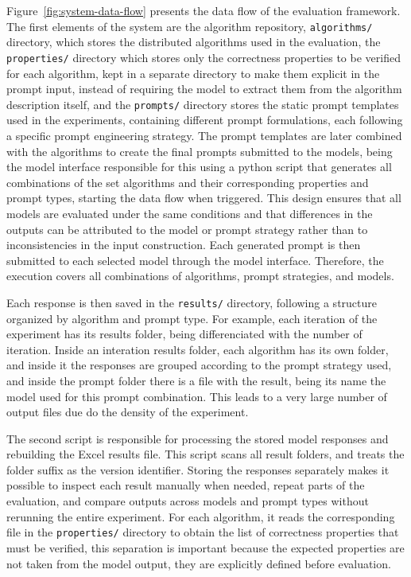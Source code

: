 Figure~\ref{fig:system-data-flow} presents the data flow of the evaluation framework. The first elements of the system are the algorithm repository, \texttt{algorithms/} directory, which stores the distributed algorithms used in the evaluation, the \texttt{properties/} directory which stores only the correctness properties to be verified for each algorithm, kept in a separate directory to make them explicit in the prompt input, instead of requiring the model to extract them from the algorithm description itself, and the \texttt{prompts/} directory stores the static prompt templates used in the experiments, containing different prompt formulations, each following a specific prompt engineering strategy. The prompt templates are later combined with the algorithms to create the final prompts submitted to the models, being the model interface responsible for this using a python script that generates all combinations of the set algorithms and their corresponding properties and prompt types, starting the data flow when triggered. This design ensures that all models are evaluated under the same conditions and that differences in the outputs can be attributed to the model or prompt strategy rather than to inconsistencies in the input construction. Each generated prompt is then submitted to each selected model through the model interface. Therefore, the execution covers all combinations of algorithms, prompt strategies, and models. 

Each response is then saved in the \texttt{results/} directory, following a structure organized by algorithm and prompt type. For example, each iteration of the experiment has its results folder, being differenciated with the number of iteration. Inside an interation results folder, each algorithm has its own folder, and inside it the responses are grouped according to the prompt strategy used, and inside the prompt folder there is a file with the result, being its name the model used for this prompt combination. This leads to a very large number of output files due do the density of the experiment. 

The second script is responsible for processing the stored model responses and rebuilding the Excel results file. This script scans all result folders, and treats the folder suffix as the version identifier. Storing the responses separately makes it possible to inspect each result manually when needed, repeat parts of the evaluation, and compare outputs across models and prompt types without rerunning the entire experiment. For each algorithm, it reads the corresponding file in the \texttt{properties/} directory to obtain the list of correctness properties that must be verified, this separation is important because the expected properties are not taken from the model output, they are explicitly defined before evaluation. 

